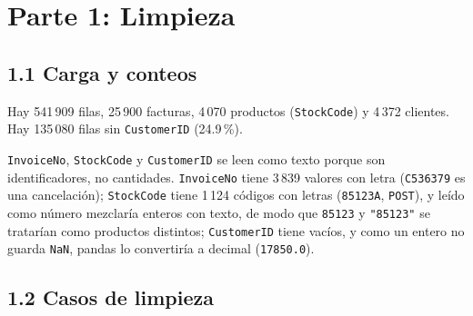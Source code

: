 \documentclass[11pt,letterpaper]{article}
\begin{document}
\section*{Parte 1: Limpieza}

\subsection*{1.1 Carga y conteos}

Hay 541\,909 filas, 25\,900 facturas, 4\,070 productos (\texttt{StockCode}) y 4\,372 clientes. Hay 135\,080 filas sin \texttt{CustomerID} (24.9\,\%).

\texttt{InvoiceNo}, \texttt{StockCode} y \texttt{CustomerID} se leen como texto porque son identificadores, no cantidades. \texttt{InvoiceNo} tiene 3\,839 valores con letra (\texttt{C536379} es una cancelación); \texttt{StockCode} tiene 1\,124 códigos con letras (\texttt{85123A}, \texttt{POST}), y leído como número mezclaría enteros con texto, de modo que \texttt{85123} y \texttt{"85123"} se tratarían como productos distintos; \texttt{CustomerID} tiene vacíos, y como un entero no guarda \texttt{NaN}, pandas lo convertiría a decimal (\texttt{17850.0}).

\subsection*{1.2 Casos de limpieza}
\end{document}
